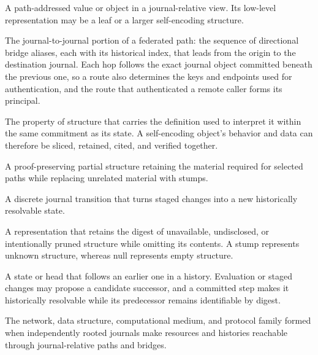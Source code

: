 \begin{description}[style=nextline]
    A path-addressed value or object in a journal-relative view. Its low-level representation may be a leaf or a larger self-encoding structure.

    The journal-to-journal portion of a federated path: the sequence of directional bridge aliases, each with its historical index, that leads from the origin to the destination journal. Each hop follows the exact journal object committed beneath the previous one, so a route also determines the keys and endpoints used for authentication, and the route that authenticated a remote caller forms its principal.

    The property of structure that carries the definition used to interpret it within the same commitment as its state. A self-encoding object's behavior and data can therefore be sliced, retained, cited, and verified together.

    A proof-preserving partial structure retaining the material required for selected paths while replacing unrelated material with stumps.

    A discrete journal transition that turns staged changes into a new historically resolvable state.

    A representation that retains the digest of unavailable, undisclosed, or intentionally pruned structure while omitting its contents. A stump represents unknown structure, whereas null represents empty structure.

    A state or head that follows an earlier one in a history. Evaluation or staged changes may propose a candidate successor, and a committed step makes it historically resolvable while its predecessor remains identifiable by digest.

    The network, data structure, computational medium, and protocol family formed when independently rooted journals make resources and histories reachable through journal-relative paths and bridges.

\end{description}
